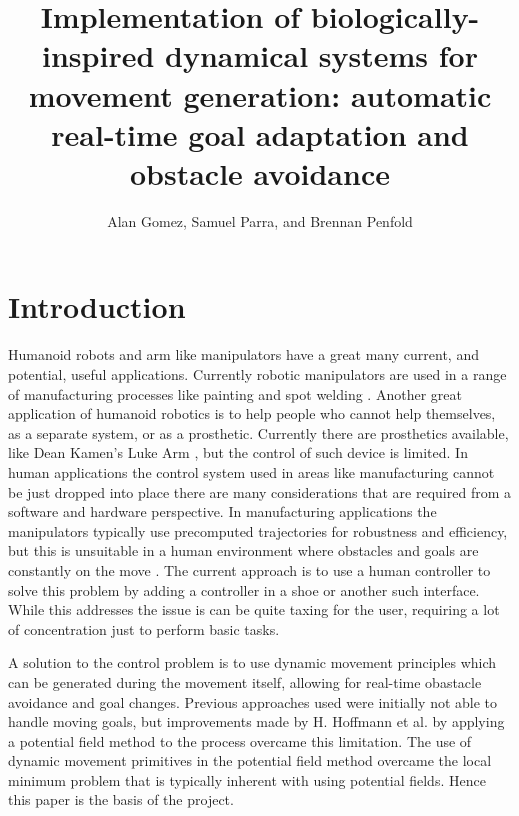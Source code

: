 \documentclass[a4paper, 10pt, conference]{ieeeconf}      %
\title{\LARGE \bf Implementation of biologically-inspired dynamical systems for movement generation: automatic real-time goal adaptation and obstacle avoidance}
\author{Alan Gomez, Samuel Parra, and Brennan Penfold}
\begin{document}
\maketitle
\thispagestyle{empty}
\pagestyle{empty}


\begin{abstract}


\end{abstract}


\section{Introduction} %

Humanoid robots and arm like manipulators have a great many current, and potential, useful applications. Currently robotic manipulators are used in a range of manufacturing processes like painting and spot welding \cite{Fadalil}. Another great application of humanoid robotics is to help people who cannot help themselves, as a separate system, or as a prosthetic. Currently there are prosthetics available, like Dean Kamen's Luke Arm \cite{Adee}, but the control of such device is limited. In human applications the control system used in areas like manufacturing cannot be just dropped into place there are many considerations that are required from a software and hardware perspective. In manufacturing applications the manipulators typically use precomputed trajectories for robustness and efficiency, but this is unsuitable in a human environment where obstacles and goals are constantly on the move \cite{Hoffmann}. The current approach is to use a human controller to solve this problem by adding a controller in a shoe \cite{Adee} or another such interface. While this addresses the issue is can be quite taxing for the user, requiring a lot of concentration just to perform basic tasks.

A solution to the control problem is to use dynamic movement principles which can be generated during the movement itself, allowing for real-time obastacle avoidance and goal changes. Previous approaches \cite{Janabi-Sharif} used were initially not able to handle moving goals, but improvements made by H. Hoffmann et al. \cite{Hoffmann} by applying a potential field method to the process overcame this limitation. The use of dynamic movement primitives in the potential field method overcame the local minimum problem that is typically inherent with using potential fields. Hence this paper is the basis of the project.
\end{document}
